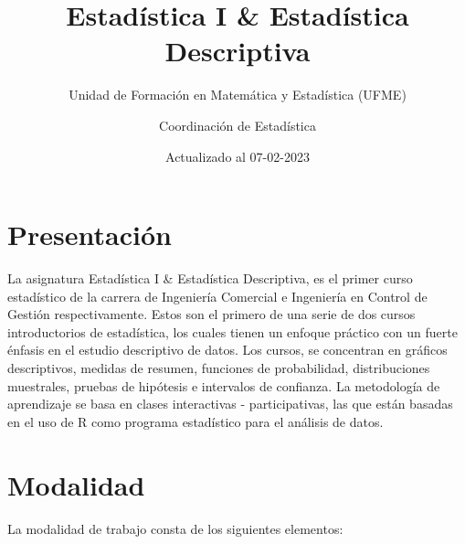 \documentclass[
]{book}
\title{Estadística I \& Estadística Descriptiva}
\subtitle{Unidad de Formación en Matemática y Estadística (UFME)}
\author{Coordinación de Estadística}
\date{Actualizado al 07-02-2023}
\begin{document}
\maketitle

{
\setcounter{tocdepth}{1}
\tableofcontents
}
\hypertarget{presentaciuxf3n}{%
\chapter*{Presentación}\label{presentaciuxf3n}}

La asignatura Estadística I \& Estadística Descriptiva, es el primer curso estadístico de la carrera de Ingeniería Comercial e Ingeniería en Control de Gestión respectivamente. Estos son el primero de una serie de dos cursos introductorios de estadística, los cuales tienen un enfoque práctico con un fuerte énfasis en el estudio descriptivo de datos. Los cursos, se concentran en gráficos descriptivos, medidas de resumen, funciones de probabilidad, distribuciones muestrales, pruebas de hipótesis e intervalos de confianza. La metodología de aprendizaje se basa en clases interactivas - participativas, las que están basadas en el uso de R como programa estadístico para el análisis de datos.

\hypertarget{modalidad}{%
\chapter*{Modalidad}\label{modalidad}}

La modalidad de trabajo consta de los siguientes elementos:
\end{document}
